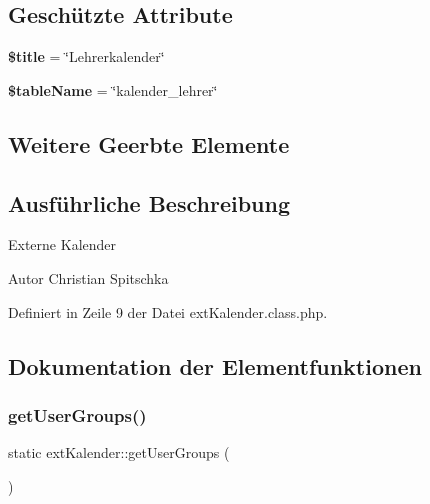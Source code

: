 \subsection*{Geschützte Attribute}
\begin{DoxyCompactItemize}
\item 
\mbox{\label{classext_kalender_aead066570364597378016d38f7ce607b}} 
{\bfseries \$title} = \char`\"{}Lehrerkalender\char`\"{}
\item 
\mbox{\label{classext_kalender_ae59506d0772cb1cb9c797b2b306d7f51}} 
{\bfseries \$table\+Name} = \char`\"{}kalender\+\_\+lehrer\char`\"{}
\end{DoxyCompactItemize}
\subsection*{Weitere Geerbte Elemente}


\subsection{Ausführliche Beschreibung}
Externe Kalender

\begin{DoxyAuthor}{Autor}
Christian Spitschka 
\end{DoxyAuthor}


Definiert in Zeile 9 der Datei ext\+Kalender.\+class.\+php.



\subsection{Dokumentation der Elementfunktionen}
\mbox{\label{classext_kalender_a18a7d3f0607a8da891818017d037e4ae}} 
\subsubsection{\texorpdfstring{get\+User\+Groups()}{getUserGroups()}}
{\footnotesize\ttfamily static ext\+Kalender\+::get\+User\+Groups (\begin{DoxyParamCaption}{ }\end{DoxyParamCaption})\hspace{0.3cm}{\ttfamily [static]}}

